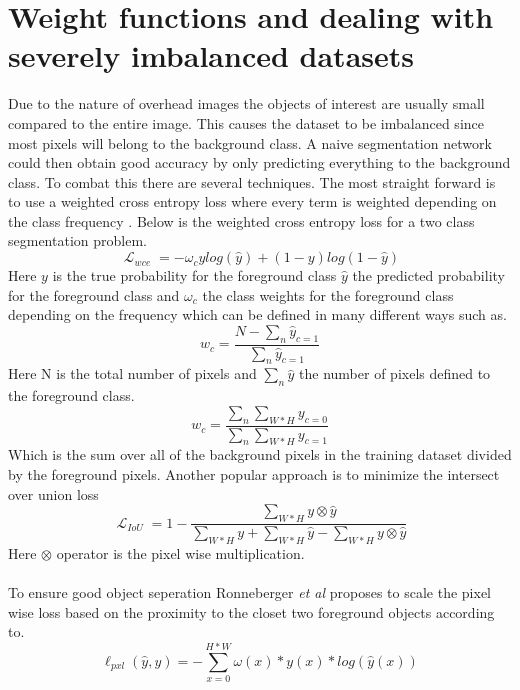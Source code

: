 \documentclass{kththesis}
\DeclareMathOperator{\Lagr}{\mathcal{L}}
\begin{document}
\section{Weight functions and dealing with severely imbalanced datasets}
Due to the nature of overhead images the objects of interest are usually small compared to the entire image. This causes the dataset to be imbalanced since most pixels will belong to the background class. A naive segmentation network could then obtain good accuracy by only predicting everything to the background class. To combat this there are several techniques. The most straight forward is to use a weighted cross entropy loss where every term is weighted depending on the class frequency \parencite{sudre_generalised_2017}. Below is the weighted cross entropy loss for a two class segmentation problem.
\begin{equation}
\Lagr_{wce}=-\omega_cylog(\hat{y}) + (1-y)log(1-\hat{y})
\end{equation}
Here $y$ is the true probability for the foreground class  $\hat{y}$ the predicted probability for the foreground class and $\omega_c$ the class weights for the foreground class depending on the frequency which can be defined in many different ways such as. 
\begin{equation}\label{eq:wc1}
w_c=\frac{N - \sum_{n}{} \hat{y}_{c=1}}{\sum_{n} \hat{y}_{c=1}}
\end{equation}
Here N is the total number of pixels and $\sum_{n}{} \hat{y}$ the number of pixels defined to the foreground class. 
\begin{equation}\label{eq:wc2}
w_c=\frac{\sum_{n}{} \sum_{W*H} y_{c=0}}{\sum_{n} \sum_{W*H} y_{c=1}}
\end{equation}
Which is the sum over all of the background pixels in the training dataset divided by the foreground pixels.
Another popular approach is to minimize the intersect over union loss \parencite{yu_unitbox:_2016, rahman_optimizing_2016}
\begin{equation}
\Lagr_{IoU}= 1 - \frac{ \sum_{W*H} y \otimes \hat{y} }{ \sum_{W*H} y + \sum_{W*H} \hat{y} - \sum_{W*H} y \otimes \hat{y}}
\end{equation}
Here $\otimes$ operator is the pixel wise multiplication.\\
\\
To ensure good object seperation Ronneberger \textit{et al} \parencite{ronneberger_u-net:_2015} proposes to scale the pixel wise loss based on the proximity to the closet two foreground objects according to.
\begin{equation}\label{eq:pxl_weight}
	\ell_{pxl}(\hat{y}, y) = - \sum_{x=0}^{H*W}\omega(x)*y(x)*log(\hat{y}(x))
\end{equation}
\end{document}
